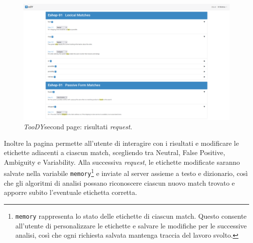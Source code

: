 \documentclass[12pt]{report}
\newcommand{\toody}{\textsl{TooDY}\xspace}
\begin{document}
\begin{figure}[H]
\centering
\includegraphics[width=1.0\textwidth]{pagina2-piena.png}
\caption{\toody \textsf{second page}: risultati \textit{request}.}
\label{fig:pagina1-login}
\end{figure}

Inoltre la pagina permette all'utente di interagire con i risultati e modificare le etichette adiacenti a ciascun match, scegliendo tra \textsf{Neutral}, \textsf{False Positive}, \textsf{Ambiguity} e \textsf{Variability}. Alla successiva \textit{request}, le etichette modificate saranno salvate nella variabile \texttt{memory}\footnote{\texttt{memory} rappresenta lo stato delle etichette di ciascun match. Questo consente all'utente di personalizzare le etichette e salvare le modifiche per le successive analisi, così che ogni richiesta salvata mantenga traccia del lavoro svolto.} e inviate al server assieme a testo e dizionario, così che gli algoritmi di analisi possano riconoscere ciascun nuovo match trovato e apporre subito l'eventuale etichetta corretta.
\end{document}
